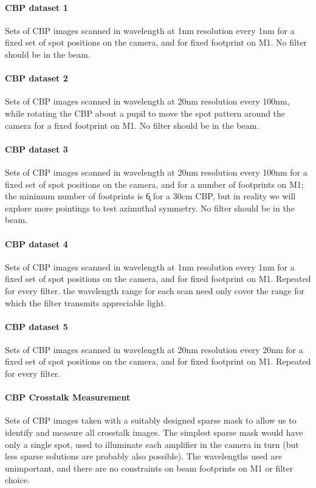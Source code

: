 \paragraph{CBP dataset 1}\label{sec:CPP:inputs:CBP:mono}
Sets of CBP images scanned in wavelength at 1nm resolution every 1nm for a fixed set of spot positions on the camera, and for fixed footprint on M1. No filter should be in the beam.
	
	
\paragraph{CBP dataset 2}\label{sec:CPP:inputs:CBP:spot}
Sets of CBP images scanned in wavelength at 20nm resolution every 100nm, while rotating the CBP about a pupil to move the spot pattern around the camera for a fixed footprint on M1. No filter should be in the beam.

	
\paragraph{CBP dataset 3}\label{sec:CPP:inputs:CBP:M1}
Sets of CBP images scanned in wavelength at 20nm resolution every 100nm for a fixed set of spot positions on the camera, and for a number of footprints on M1; the minimum number of footprints is \c 6 for a 30cm CBP, but in reality we will explore more pointings to test azimuthal symmetry. No filter should be in the beam.


\paragraph{CBP dataset 4}\label{sec:CPP:inputs:CBP:filter}
Sets of CBP images scanned in wavelength at 1nm resolution every 1nm for a fixed set of spot positions on the camera, and for fixed footprint on M1. Repeated for every filter. \Nb the wavelength range for each scan need only cover the range for which the filter transmits appreciable light.


\paragraph{CBP dataset 5}\label{sec:CPP:inputs:CBP:leak}
Sets of CBP images scanned in wavelength at 20nm resolution every 20nm for a fixed set of spot positions on the camera, and for fixed footprint on M1. Repeated for every filter.


\paragraph {CBP Crosstalk Measurement}\label{sec:CPP:inputs:CBP:crosstalk}
Sets of CBP images taken with a suitably designed sparse mask to allow us to identify and measure all crosstalk images. The simplest sparse mask would have only a single spot, used to illuminate each amplifier in the camera in turn (but less sparse solutions are probably also possible). The wavelengths used are unimportant, and there are no constraints on beam footprints on M1 or filter choice.


